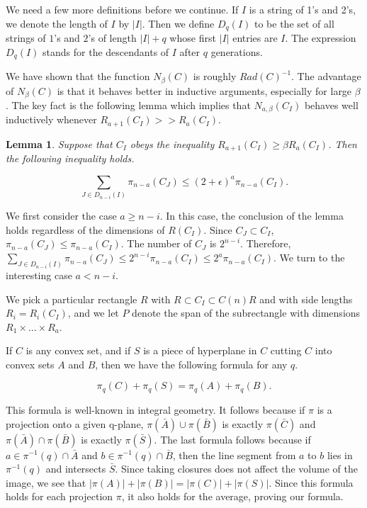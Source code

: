 \documentclass{amsart}
\newtheorem*{Theorem 1}{Theorem 1}
\newtheorem*{Theorem 2}{Theorem 2}
\newtheorem*{Theorem 1A}{Theorem 1A}
\newtheorem*{Theorem 2A}{Theorem 2A}
\newtheorem{lemma}{Lemma}[section]
\newtheorem*{vanishing lemma}{Vanishing Lemma}
\numberwithin{equation}{section}
\begin{document}
We need a few more definitions before we continue.  If $I$ is a
string of 1's and 2's, we denote the length of $I$ by $|I|$. 
Then we define $D_q(I)$ to be the set of all strings of $1$'s and
$2$'s of length $|I| + q$ whose first $|I|$ entries are $I$.  The
expression $D_q(I)$ stands for the descendants of $I$ after $q$
generations.

We have shown that the function $N_\beta(C)$ is roughly $Rad(C)^{-1}$.  The
advantage of $N_\beta(C)$ is that it behaves better in inductive
arguments, especially for large $\beta$.  
The key fact is the following lemma which implies that
$N_{a, \beta}(C_I)$ behaves well inductively whenever $R_{a+1}(C_I) >>
R_a(C_I)$.

\begin{lemma} Suppose that $C_I$ obeys the inequality
$R_{a+1}(C_I) \ge \beta R_a(C_I)$.
Then the following inequality holds.

$$\sum_{J \in D_{n-i}(I)} \pi_{n-a}(C_J) \le (2 + \epsilon)^a
\pi_{n-a}(C_I).$$

\end{lemma}

\proof We first consider the case $a \ge n-i$.  In this case,
the conclusion of the lemma holds regardless of the dimensions of
$R(C_I)$.  Since $C_J \subset C_I$, $\pi_{n-a}(C_J) \le \pi_{n-a}(C_I)$.
The number of $C_J$ is $2^{n-i}$.  Therefore, $\sum_{J \in D_{n-i}(I)}
\pi_{n-a}(C_J) \le 2^{n-i} \pi_{n-a}(C_I) \le 2^a \pi_{n-a}(C_I)$.
We turn to the interesting case $a < n-i$.

We pick a particular rectangle $R$ with $R \subset C_I \subset
C(n) R$ and with side lengths $R_i = R_i(C_I)$, and we let $P$
denote the span of the subrectangle with dimensions $R_1 \times
... \times R_a$.

If $C$ is any convex set, and if $S$ is a piece of hyperplane in
$C$ cutting $C$ into convex sets $A$ and $B$, then we have the
following formula for any $q$.

$$\pi_q(C) + \pi_q(S) = \pi_q(A) + \pi_q(B).$$

This formula is well-known in integral geometry.  It follows
because if $\pi$ is a projection onto a given q-plane, $\pi(\bar
A) \cup \pi(\bar B)$ is exactly $\pi(\bar C)$ and $\pi(\bar A)
\cap \pi(\bar B)$ is exactly $\pi(\bar S)$.  The last formula
follows because if $a \in \pi^{-1}(q) \cap \bar A$ and $b \in
\pi^{-1}(q) \cap \bar B$, then the line segment from $a$ to $b$
lies in $\pi^{-1}(q)$ and intersects $\bar S$.  Since taking
closures does not affect the volume of the image, we see that
$|\pi(A)| + |\pi(B)| = |\pi(C)| + |\pi(S)|$.  Since this formula
holds for each projection $\pi$, it also holds for the average,
proving our formula.
\end{document}
